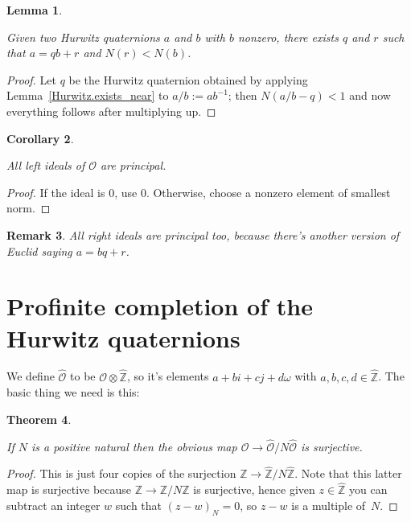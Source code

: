 \documentclass[10pt,a4paper]{article}
\newcommand{\Z}{\mathbb{Z}}
\newcommand{\calO}{\mathcal{O}}
\newcommand{\calOhat}{\widehat{\calO}}
\newcommand{\Zhat}{\widehat{\Z}}
\newcounter{chapter}
\newtheorem{theorem}{Theorem}[chapter]
\newtheorem{corollary}[theorem]{Corollary}
\newtheorem{remark}[theorem]{Remark}
\newtheorem{lemma}[theorem]{Lemma}
\newcommand{\uses}[1]{}
\newcommand{\lean}[1]{}
\newcommand{\leanok}{}
\begin{document}
\begin{lemma}
    \label{Hurwitz.quot_rem}
    \lean{Hurwitz.quot_rem}
    \uses{Hurwitz.norm, Hurwitz.exists_near}
    \leanok
    Given two Hurwitz quaternions $a$ and $b$ with $b$ nonzero, there exists
    $q$ and $r$ such that $a=qb+r$ and $N(r)<N(b)$.
\end{lemma}
\begin{proof}
    \leanok
  Let $q$ be the Hurwitz quaternion obtained by applying Lemma~\ref{Hurwitz.exists_near}
  to $a/b := ab^{-1}$; then $N(a/b-q)<1$ and now everything follows after multiplying up.
\end{proof}

\begin{corollary}
    \label{Hurwitz.left_ideal_princ}
    \lean{Hurwitz.left_ideal_princ}
    \uses{Hurwitz.norm}
    \leanok
    All left ideals of $\calO$ are principal.
\end{corollary}
\begin{proof}
    \uses{Hurwitz.quot_rem}
    \leanok
    If the ideal is 0, use 0. Otherwise, choose a nonzero element of smallest norm.
\end{proof}

\begin{remark}
    All right ideals are principal too, because there's
    another version of Euclid saying $a=bq+r$.
\end{remark}

\section{Profinite completion of the Hurwitz quaternions}

We define $\calOhat$ to be $\calO\otimes\Zhat$, so it's elements $a+bi+cj+d\omega$
with $a,b,c,d\in\Zhat$. The basic thing we need is this:

\begin{theorem}
    \label{Hurwitz.surjective_pnat_quotient}
    \uses{Hurwitz}
    If $N$ is a positive natural then the obvious map $\calO\to\calOhat/N\calOhat$ is surjective.
\end{theorem}
\begin{proof}
    This is just four copies of the surjection $\Z\to\Zhat/N\Zhat$.
    Note that this latter map is surjective because $\Z\to\Z/N\Z$ is surjective,
    hence given $z\in\Zhat$ you can subtract an integer $w$ such
    that $(z-w)_N=0$, so $z-w$ is a multiple of~$N$.
\end{proof}
\end{document}
